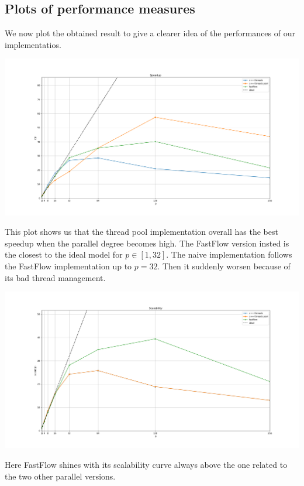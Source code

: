 \documentclass[11pt]{article}
\begin{document}
\subsection{Plots of performance measures}
We now plot the obtained result to give a clearer idea of the performances of our implementatios.

\begin{center}
	\begin{minipage}{\textwidth}
		\includegraphics[width=\linewidth]{plots/SPEEDUP-10-1024-10000.png}
	\end{minipage}
\end{center}
This plot shows us that the thread pool implementation overall has the best speedup when the parallel degree becomes high. The FastFlow version insted is the closest to the ideal model for $ p \in [1,32] $. The naive implementation follows the FastFlow implementation up to $ p=32 $. Then it suddenly worsen because of its bad thread management.

\begin{center}
	\begin{minipage}{\linewidth}
		\includegraphics[width=\linewidth]{plots/SCALAB-10-1024-10000.png}
	\end{minipage}
\end{center}
Here FastFlow shines with its scalability curve always above the one related to the two other parallel versions.
\end{document}
